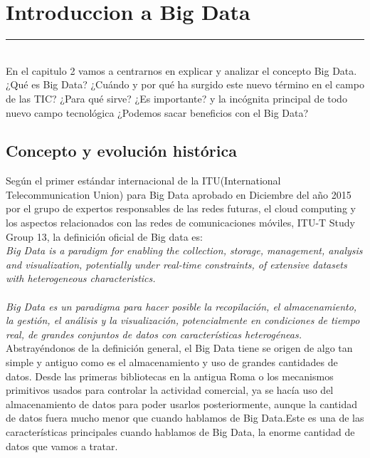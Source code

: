 \chapter{Introduccion a Big Data}
\rule{\textwidth}{3pt}\\[10ex]

En el capitulo 2 vamos a centrarnos en explicar y  analizar el concepto Big Data. ¿Qué es Big Data? ¿Cuándo y por qué ha surgido este nuevo término en el campo de las TIC? ¿Para qué sirve? ¿Es importante? y la incógnita principal de todo nuevo campo tecnológica ¿Podemos sacar beneficios con el Big Data?
\\[1cm]
\section{Concepto y evolución histórica}

Según el  primer estándar internacional de la ITU(International Telecommunication Union) para Big Data aprobado en Diciembre del año 2015 por el grupo de expertos responsables de las redes futuras, el cloud computing y los aspectos relacionados con las redes de comunicaciones móviles, ITU-T Study Group 13, la definición oficial de Big data es:\\

\emph{Big Data is a paradigm for enabling the collection, storage, management, analysis and visualization, potentially under real-time constraints, of extensive datasets with heterogeneous characteristics.}\\
\\
\textit{Big Data es un paradigma para hacer posible la recopilación, el almacenamiento, la gestión, el análisis y la visualización, potencialmente en condiciones de tiempo real, de grandes conjuntos de datos con características heterogéneas.}
\cite{ITU_standard}\\

Abstrayéndonos de la definición general, el Big Data tiene se origen de algo tan simple y antiguo como es el almacenamiento y uso de grandes cantidades de datos.
Desde las primeras bibliotecas en la antigua Roma o los mecanismos primitivos usados para controlar la actividad comercial, ya se hacía uso del almacenamiento de datos para poder usarlos  posteriormente, aunque la cantidad de datos fuera mucho menor que cuando hablamos de Big Data.Este es una de las características principales cuando hablamos de Big Data, la enorme cantidad de datos que vamos a tratar.\\

